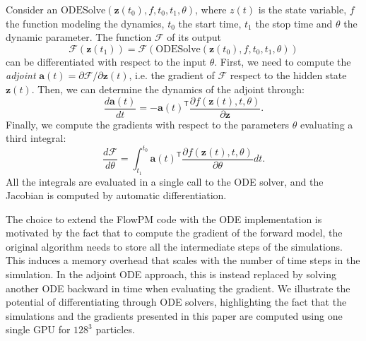 \documentclass{aa}
\begin{document}
Consider an $\text{ODESolve}(\textbf{z}(t_0),f,t_0,t_1, \theta)$, 
 where $z(t)$ is the state variable, $f$ the function modeling the dynamics, $t_0$ the start time, $t_1$ the stop time and $\theta$ the dynamic parameter. The function  $\mathcal{F}$ of its output
 \begin{equation}
     \mathcal{F}(\textbf{z}(t_1))=   \mathcal{F} (\text{ODESolve}(\textbf{z}(t_0),f,t_0,t_1, \theta))
 \end{equation}
can be differentiated with respect to the input $\theta$.
 First, we need to compute the \textit{adjoint} $\textbf{a}(t)=\partial \mathcal{F}/ \partial \textbf{z}(t)$, i.e. the gradient of $\mathcal{F}$ respect to the hidden state $\textbf{z}(t)$.  
 Then, we can determine the dynamics of the adjoint through:
 \begin{equation}
     \frac{d \textbf{a}(t)}{dt}=-\textbf{a}(t)^{ \mathsf{T}}\frac{\partial f (\textbf{z}(t),t,\theta)}{\partial \textbf{z}}.
 \end{equation}
 Finally, we compute the gradients with respect to the parameters $\theta$ evaluating a third integral:
 \begin{equation}
     \frac{d\mathcal{F}}{d\theta}=
     \int_{t_1}^{t_0} \textbf{a}(t)^{ \mathsf{T}}
     \frac{\partial f (\textbf{z}(t),t,\theta)}{\partial \theta } dt.
 \end{equation}
All the integrals are evaluated in a single call to the ODE solver, and the Jacobian is computed by automatic differentiation. 
 



The choice to extend the FlowPM code with the ODE implementation is motivated by the fact that to compute the gradient of the forward model, the original algorithm needs to store all the intermediate steps of the simulations. This induces a memory overhead that scales with the number of time steps in the simulation. In the adjoint ODE approach, this is instead replaced by solving another ODE backward in time when evaluating the gradient. 
We illustrate the potential of differentiating through ODE solvers, highlighting the fact that the simulations and the gradients presented in this paper are computed using one single GPU for $128^3$ particles. 
\end{document}

